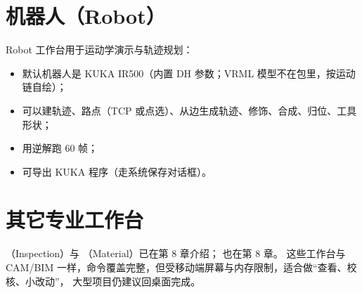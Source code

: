 \section{机器人（Robot）}

Robot 工作台用于运动学演示与轨迹规划：

\begin{itemize}
  \item 默认机器人是 KUKA IR500（内置 DH 参数；VRML 模型不在包里，按运动链自绘）；
  \item 可以建轨迹、路点（TCP 或点选）、从边生成轨迹、修饰、合成、归位、工具形状；
  \item {} 用逆解跑 60 帧；
  \item 可导出 KUKA  程序（走系统保存对话框）。
\end{itemize}

\section{其它专业工作台}

（Inspection）与 （Material）已在第 8 章介绍； 也在第 8 章。
这些工作台与 CAM/BIM 一样，命令覆盖完整，但受移动端屏幕与内存限制，适合做“查看、校核、小改动”，
大型项目仍建议回桌面完成。
